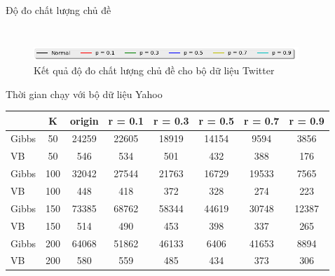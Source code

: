 \documentclass[pdf]{beamer}
\begin{document}
\begin{frame}{Độ đo chất lượng chủ đề }
\begin{columns}[T]
\begin{column}{.50\textwidth}
\begin{figure}
		\end{figure}				
	\end{column} %
\end{columns}
 \begin{figure}
	\begin{center}
		\captionsetup{justification=centering}
		\includegraphics[width=100mm]{menu.png}
		\caption{Kết quả độ đo chất lượng chủ đề cho bộ dữ liệu Twitter}
	\end{center}
\end{figure}
\end{frame}

\begin{frame}{Thời gian chạy với bộ dữ liệu Yahoo}
\begin{tabular}{l|c |c | c | c | c | c | c }
	& K & origin & r = 0.1 & r = 0.3 & r = 0.5 & r = 0.7 & r = 0.9 \\
	\hline \hline
	Gibbs &50 & 24259& 22605 & 18919 & 14154 & 9594 & 3856 \\ 
	\hline
	VB &50 & 546& 534 & 501 & 432 &388 & 176 \\
	\hline \hline
	Gibbs &100 &32042 & 27544 & 21763 & 16729 & 19533&  7565\\ 
	\hline
	VB &100 &448 & 418 & 372 & 328 &274 &223\\
	\hline \hline
	Gibbs &150 &73385 & 68762 & 58344 & 44619 & 30748& 12387 \\ 
	\hline
	VB &150 &514 & 490 & 453 & 398 &337 &265\\
	\hline \hline
	Gibbs &200 & 64068& 51862 & 46133 & 6406 & 41653 & 8894 \\ 
	\hline
	VB &200 &580 & 559 & 485 & 434 & 373 &306\\
\end{tabular}
\end{frame}
\end{document}
